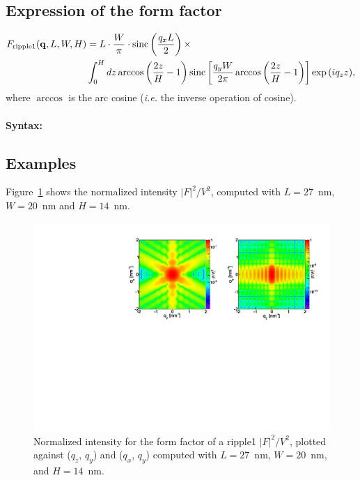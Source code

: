 \subsection{Expression of the form factor}
\begin{align*}
F_{\rm{ripple1}}(\mathbf{q},L,W,H) &=L \cdot \frac{W}{\pi}\cdot \operatorname{sinc}\left(\frac{q_xL}{2}\right)\times \\ &\int_0^H{dz \arccos\left(\frac{2z}{H}-1\right)\operatorname{sinc}\left[\frac{q_yW}{2\pi}\arccos\left(\frac{2z}{H} - 1\right)\right]\exp\left(iq_zz\right)},
\end{align*}
where $\arccos$ is the  arc cosine (\textit{i.e.} the inverse
operation of cosine).

\paragraph{Syntax:} 

\subsection{Examples}
Figure~\ref{fig:FFripple1Ex} shows the normalized intensity
$|F|^2/V^2$, computed with $L=27$~nm, $W=20$~nm and $H=14$~nm.

\begin{figure}[h]
\begin{center}
\includegraphics[width=\textwidth]{Figures/figffripple1}
\end{center}
\caption{Normalized intensity for the form factor of a ripple1
  $|F|^2/V^2$, plotted against ($q_z$, $q_y$) and  ($q_x$, $q_y$)
  computed with $L=27$~nm, $W=20$~nm, and $H=14$~nm.}
\label{fig:FFripple1Ex}
\end{figure}
\FloatBarrier

